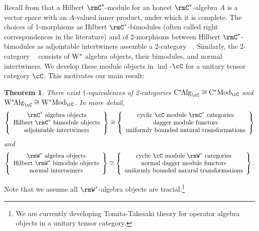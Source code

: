 \documentclass[11pt,reqno]{amsart}
\DeclareMathOperator{\ind}{ind}
\DeclareMathOperator{\CMod}{C^*Mod}
\DeclareMathOperator{\WMod}{W^*Mod}
\DeclareMathOperator{\CAlg}{C^*\!Alg}
\DeclareMathOperator{\WAlg}{W^*\!Alg}
\numberwithin{equation}{section}
\theoremstyle{plain}
\newtheorem{thmalpha}{Theorem}
\begin{document}
Recall from \cite{Lan95,BLM04,MT05,Bla05} that a Hilbert $\rmC^*$-module for an honest $\rmC^*$-algebra $A$ is a vector space with an $A$-valued inner product, under which it is complete.
The choices of 1-morphisms as Hilbert $\rmC^*$-bimodules (often called right correspondences in the literature) and of 2-morphisms between Hilbert $\rmC^*$-bimodules as adjointable intertwiners assemble a 2-category $\CAlg$.
Similarly, the 2-category $\WAlg$ consists of $\rm W^*$ algebra objects, their bimodules, and normal intertwiners.
We develop these module objects in $\ind$-$\cC$ for a unitary tensor category $\cC$.
This motivates our main result:
\begin{thmalpha} \label{thm:A}
There exist $\dagger$-equivalences of 2-categories $\CAlg_{\cC} \cong \CMod_{\cC}$ and $\WAlg_{\cC} \cong \WMod_{\cC}$.
In more detail,
\[
  \left\{ \begin{array}{c}
    \rmC^* \text{ algebra objects} \\
    \text{Hilbert } \rmC^* \text{ bimodule objects} \\
    \text{adjointable intertwiners}
  \end{array}\right\}
  \cong
  \left\{ \begin{array}{c}
    \text{cyclic } \cC \text{ module } \rmC^* \text{ categories} \\
    \text{dagger module functors} \\
    \text{uniformly bounded natural transformations}
  \end{array}\right\}
  \]
  and
  \[
  \left\{ \begin{array}{c}
    \rmW^* \text{ algebra objects} \\
    \text{Hilbert } \rmW^* \text{ bimodule objects} \\
    \text{normal intertwiners}
  \end{array}\right\}
  \cong
  \left\{ \begin{array}{c}
    \text{cyclic } \cC \text{ module } \rmW^* \text{ categories} \\
    \text{normal dagger module functors} \\
    \text{uniformly bounded natural transformations}
  \end{array}\right\}.
\]
\end{thmalpha}
Note that we assume all $\rmW^*$-algebra objects are tracial.\footnote{We are currently developing Tomita-Takesaki theory for operator algebra objects in a unitary tensor category.
}
\end{document}
